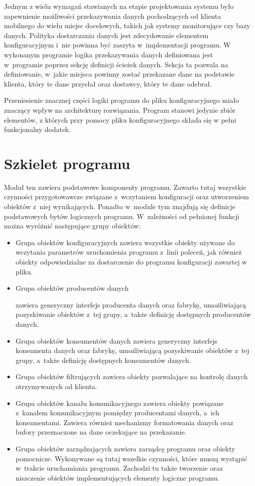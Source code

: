 Jednym z wielu wymagań stawianych na etapie projektowania systemu było
zapewnienie możliwości przekazywania danych pochodzących od klienta
mobilnego do wielu miejsc docelowych, takich jak systemy monitorujące
czy bazy danych. Polityka dostarczania danych jest zdecydowanie
elementem konfiguracyjnym i~nie powinna być zaszyta w~implementacji
programu. W wykonanym programie logika przekazywania danych
definiowana jest w~programie poprzez sekcję definicji ścieżek
danych. Sekcja ta pozwala na definiowanie, w~jakie miejsca powinny
zostać przekazane dane na podstawie klienta, który te dane przysłał
oraz dostawcy, który te dane odebrał.

Przeniesienie znacznej części logiki programu do pliku
konfiguracyjnego miało znaczący wpływ na architekturę
rozwiązania. Program stanowi jedynie zbiór elementów, z których przy
pomocy pliku konfiguracyjnego składa się w pełni funkcjonalny dodatek.

\section[Szkielet programu][Szkielet programu]{Szkielet programu}

Moduł ten zawiera podstawowe komponenty programu. Zawarto tutaj
wszystkie czynności przygotowawcze związane z~wczytaniem konfiguracji
oraz utworzeniem obiektów z~niej wynikających. Ponadto w~module tym
znajdują się definicje podstawowych bytów logicznych
programu. W~zależności od pełnionej funkcji można wyróżnić następujące
grupy obiektów:

\begin{itemize}
\item Grupa obiektów konfiguracyjnych zawiera wszystkie obiekty
  używane do wczytania parametrów uruchomienia programu z~linii
  poleceń, jak również obiekty odpowiedzialne za dostarczenie do
  programu konfiguracji zawartej w pliku.
\item Grupa obiektów producentów danych \raggedright{zawiera
  generyczny interfejs producenta danych oraz fabrykę, umożliwiającą
  pozyskiwanie obiektów z~tej grupy, a~także definicję dostępnych
  producentów danych.}
\item Grupa obiektów konsumentów danych zawiera generyczny interfejs
  konsumenta danych oraz fabrykę, umożliwiającą pozyskiwanie obiektów
  z~tej grupy, a~także definicję dostępnych konsumentów danych.
\item Grupa obiektów filtrujących zawiera obiekty pozwalające na
  kontrolę danych otrzymywanych od klienta.
\item Grupa obiektów kanału komunikacyjnego zawiera obiekty powiązane
  z~kanałem komunikacyjnym pomiędzy producentami danych, a~ich
  konsumentami. Zawiera również mechanizmy formatowania danych oraz
  bufory przeznaczone na dane oczekujące na przekazanie.
\item Grupa obiektów zarządzających zawiera zarządcę programu oraz
  obiekty pomocnicze. Wykonywane są tutaj wszelkie czynności, które
  muszą wystąpić w~trakcie uruchamiania programu. Zachodzi tu także
  tworzenie oraz niszczenie obiektów implementujących elementy
  logiczne programu.
\end{itemize}


